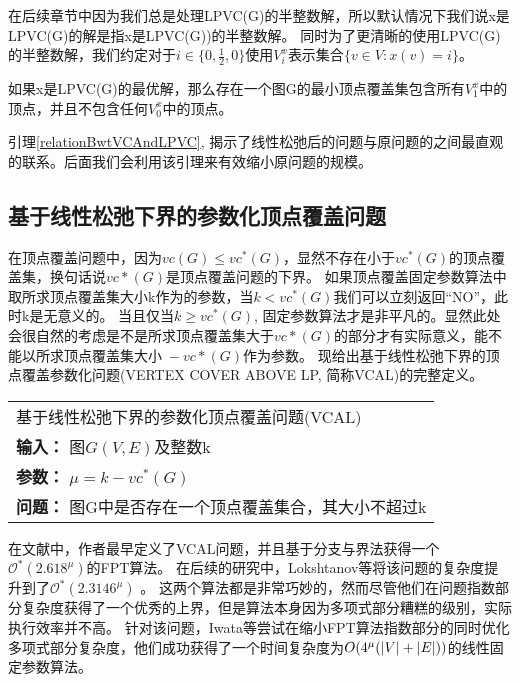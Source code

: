 在后续章节中因为我们总是处理LPVC(G)的半整数解，所以默认情况下我们说x是LPVC(G)的解是指x是LPVC(G))的半整数解。
同时为了更清晰的使用LPVC(G)的半整数解，我们约定对于$i \in \{0, \frac{1}{2}, 0\}$使用$V^x_i$表示集合$\{v \in V: x(v) = i\}$。
\begin{lemma}\label{relationBwtVCAndLPVC}
如果x是LPVC(G)的最优解，那么存在一个图G的最小顶点覆盖集包含所有$V^x_1$中的顶点，并且不包含任何$V^x_0$中的顶点。
\end{lemma}

引理\ref{relationBwtVCAndLPVC}, 揭示了线性松弛后的问题与原问题的之间最直观的联系。后面我们会利用该引理来有效缩小原问题的规模。
\subsection{基于线性松弛下界的参数化顶点覆盖问题}
在顶点覆盖问题中，因为$vc(G)\le vc^*(G)$，显然不存在小于$vc^*(G)$的顶点覆盖集，换句话说$vc*(G)$是顶点覆盖问题的下界。
如果顶点覆盖固定参数算法中取所求顶点覆盖集大小k作为的参数，当$k < vc^*(G)$我们可以立刻返回“NO”，此时k是无意义的。
当且仅当$k \ge vc^*(G)$, 固定参数算法才是非平凡的。显然此处会很自然的考虑是不是所求顶点覆盖集大于$vc*(G)$的部分才有实际意义，能不能以$所求顶点覆盖集大小\; - vc*(G)$作为参数。
现给出基于线性松弛下界的顶点覆盖参数化问题(VERTEX COVER ABOVE LP, 简称VCAL)的完整定义。\\

\begin{tabular}{| p{0.9\headwidth} |}
  \hline
  基于线性松弛下界的参数化顶点覆盖问题(VCAL) \\
  \textbf{输入：} 图$G(V, E)$及整数k \\
  \textbf{参数：} $\mu = k - vc^*(G)$\\
  \textbf{问题：} 图G中是否存在一个顶点覆盖集合，其大小不超过k\\
  \hline
\end{tabular} \vspace{0.5cm}


在文献\cite{narayanaswamy2012lp}中，作者最早定义了VCAL问题，并且基于分支与界法获得一个$\mathcal{O}^*(2.618^{\mu})$的FPT算法。
在后续的研究中，Lokshtanov等将该问题的复杂度提升到了$\mathcal{O}^*(2.3146^{\mu})$ 。
这两个算法都是非常巧妙的，然而尽管他们在问题指数部分复杂度获得了一个优秀的上界，但是算法本身因为多项式部分糟糕的级别，实际执行效率并不高。
针对该问题，Iwata等尝试在缩小FPT算法指数部分的同时优化多项式部分复杂度，他们成功获得了一个时间复杂度为$O(4^{\mu}(\left\vert V \right\vert + \left\vert E \right\vert))$的线性固定参数算法。

